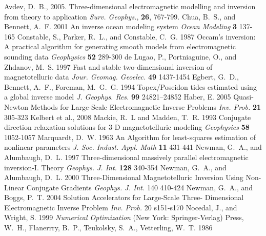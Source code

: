 \newcommand{\GPH}{Geophysics}
\newcommand{\GJI}{Geophys. J. Int.}
\newcommand{\GJRAS}{Geophys. J. R. Astr. Soc.}
\newcommand{\GRL}{Geophys. Res. Let.}
\newcommand{\JGR}{J. Geophys. Res.}
\newcommand{\EPS}{Earth, Planets, Space}
\newcommand{\JGG}{Jour. Geomag. Geoelec.}
\newcommand{\IP}{Inv. Prob.}
\newcommand{\PEPI}{Phys. Earth Planet. Inter.}

\begin{thebibliography}{}

\bibitem{}
Avdev, D.~B., 2005.
Three-dimensional electromagnetic modelling and inversion from
theory to application
{\em Surv. Geophys.}, {\bf 26}, 767-799.
%
%
\bibitem{}
Chua, B.~S., and Bennett, A.~F. 2001
An inverse ocean modeling system
{\em Ocean Modeling} {\bf 3} 137-165
%
\bibitem{}
Constable, S., Parker, R.~L., and Constable, C.~G. 1987
Occam's inversion: A practical algorithm for generating smooth models
from
electromagnetic sounding data
{\em \GPH} {\bf 52} 289-300
%
\bibitem{}
de Lugao, P., Portniaguine, O., and Zhdanov, M.~S. 1997
Fast and stable two-dimensional
inversion of magnetotelluric data
{\em \JGG} {\bf 49} 1437-1454
%
\bibitem{}
Egbert, G.~D., Bennett, A.~F., Foreman, M.~G.~G. 1994
Topex/Poseidon tides
estimated using a global inverse model
{\em \JGR} {\bf 99} 24821--24852
%
\bibitem{}
Haber, E. 2005
Quasi-Newton Methods for Large-Scale Electromagnetic Inverse Problems
{\em \IP} {\bf 21} 305-323
%
\bibitem{}
Kelbert et al., 2008
%
\bibitem{}
Mackie, R.~L and Madden, T.~R. 1993
Conjugate direction relaxation solutions for
3-D magnetotelluric modeling
{\em \GPH} {\bf 58} 1052-1057
%
\bibitem{}
Marquardt, D.~W. 1963
An Algorithm for least-squares estimation of nonlinear parameters
{\em J. Soc. Indust. Appl. Math} {\bf 11} 431-441
%
\bibitem{}
Newman, G.~A., and Alumbaugh, D.~L. 1997
Three-dimensional massively parallel
electromagnetic inversion-I. Theory
{\em \GJI} {\bf 128} 340-354
%
\bibitem{}
Newman, G.~A., and Alumbaugh, D.~L. 2000
Three-Dimensional Magnetotelluric Inversion
Using Non-Linear Conjugate Gradients
{\em \GJI} 140 410-424
%
\bibitem{}
Newman, G.~A., and Boggs, P.~T. 2004
Solution Accelerators for Large-Scale Three-
Dimensional Electromagnetic Inverse Problem
{\em \IP} 20 s151-s170
%
\bibitem{}
Nocedal, J., and Wright, S. 1999
{\em Numerical Optimization}
(New York: Springer-Verlag)
%
\bibitem{}
Press, W.~H., Flanerrry, B.~P., Teukolsky, S.~A., Vetterling, W.~T. 1986

\end{thebibliography}
